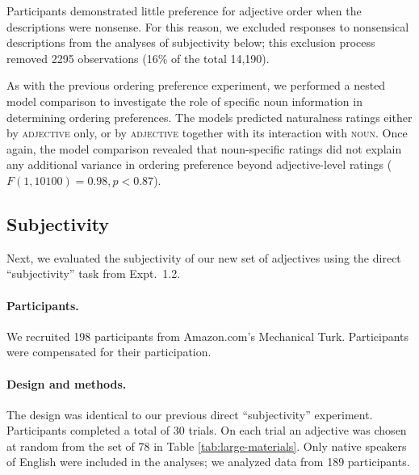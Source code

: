 \documentclass[12pt]{article}
\newcommand{\ndg}[1]{\textcolor{Green}{[ndg: #1]}}
\begin{document}
Participants demonstrated little preference for adjective order when the descriptions were nonsense. For this reason, we excluded responses to nonsensical descriptions from the analyses of subjectivity below; this exclusion process removed 2295 observations (16\% of the total 14,190).  %

As with the previous ordering preference experiment, we performed a nested model comparison to investigate the role of specific noun information in determining ordering preferences. The models predicted naturalness ratings either by \textsc{adjective} only, or by \textsc{adjective} together with its interaction with \textsc{noun}. Once again, the model comparison revealed that noun-specific ratings did not explain any additional variance in ordering preference 
beyond adjective-level ratings ($F(1,10100) = 0.98, p < 0.87$).

\subsection{Subjectivity}

Next, we evaluated the subjectivity of our new set of adjectives using the direct ``subjectivity'' task from Expt.~1.2.

\paragraph{Participants.}

We recruited 198 participants from Amazon.com's Mechanical Turk. Participants were compensated for their participation.

\paragraph{Design and methods.}

The design was identical to our previous direct ``subjectivity'' experiment. 
Participants completed a total of 30 trials. On each trial an adjective was chosen at random from the set of 78 in Table \ref{tab:large-materials}.  Only native speakers of English 
were included in the analyses; we analyzed data from 189 participants.
\end{document}
